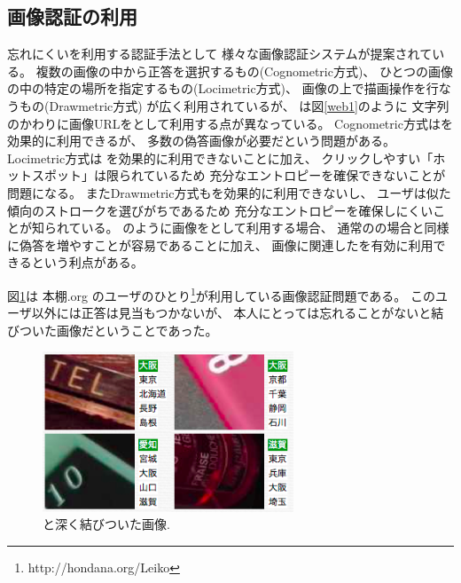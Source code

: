 \documentclass[twoside]{wiss}
\begin{document}
\subsection{画像認証の利用}

忘れにくい{\EM}を利用する認証手法として
様々な画像認証システム\cite{Biddle:2012:GPL:2333112.2333114}\cite{GraphicalPasswords}\cite{小池英樹:2006-05-15}が提案されている。
複数の画像の中から正答を選択するもの(Cognometric方式)、
ひとつの画像の中の特定の場所を指定するもの(Locimetric方式)、
画像の上で描画操作を行なうもの(Drawmetric方式)
が広く利用されているが\cite{Biddle:2012:GPL:2333112.2333114}\cite{GraphicalPasswords}\cite{Guideline}、
{\EP}は図\ref{web1}のように
文字列のかわりに画像URLを{\SQ}として利用する点が異なっている。
%
Cognometric方式は{\EM}を効果的に利用できるが、
多数の偽答画像が必要だという問題がある。
Locimetric方式は
{\EM}を効果的に利用できないことに加え、
クリックしやすい「ホットスポット」は限られているため
充分なエントロピーを確保できないことが問題になる\cite{Dirik:2007:MUC:1280680.1280684}。
またDrawmetric方式も{\EM}を効果的に利用できないし、
ユーザは似た傾向のストロークを選びがちであるため
充分なエントロピーを確保しにくいことが知られている\cite{Nali}。
%
{\EP}のように画像を{\SQ}として利用する場合、
通常の{\SQ}の場合と同様に偽答を増やすことが容易であることに加え、
画像に関連した{\EM}を有効に利用できるという利点がある\cite{増井:CSS}。

図\ref{leiko}は
本棚.org\cite{hondana}\cite{hondanaorg}
のユーザのひとり\footnote{
  \textsf{http://hondana.org/Leiko}
}が利用している画像認証問題である。
このユーザ以外には正答は見当もつかないが、
本人にとっては忘れることがない{\EM}と結びついた画像だということであった。

\begin{figure}[H]
\centerline{\includegraphics[width=75mm,bb=0 0 335 213]{figures/4084ac59b42d183d7124481477e84999.png}}
\caption{{\EM}と深く結びついた画像.}
\label{leiko}
\end{figure}
\end{document}
